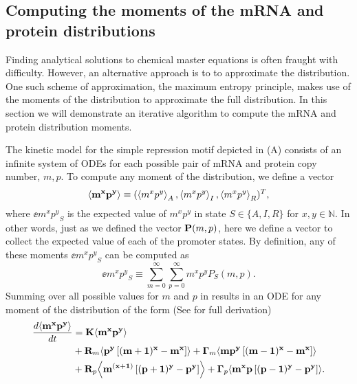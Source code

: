 \subsection{Computing the moments of the mRNA and protein distributions}
\label{sec_moments}

Finding analytical solutions to chemical master equations is often fraught with
difficulty. However, an alternative approach is to to approximate the
distribution. One such scheme of approximation, the maximum entropy principle,
makes use of the moments of the distribution to approximate the full
distribution. In this section we will demonstrate an iterative algorithm to
compute the mRNA and protein distribution moments.

The kinetic model for the simple repression motif depicted in
(A) consists of an infinite system of ODEs for each
possible pair of mRNA and protein copy number, $m, p$. To compute any moment of
the distribution, we define a vector
\begin{equation}
	\left\langle \mathbf{m^x p^y} \right\rangle \equiv (\left\langle m^x p^y \right\rangle_A, \left\langle m^x p^y \right\rangle_I, \left\langle m^x p^y \right\rangle_R)^T,
\end{equation}
where $\ee{m^x p^y}_S$ is the expected value of $m^x p^y$ in state $S \in \{A,
I, R\}$ for $x, y \in \mathbb{N}$. In other words, just as we defined the
vector $\mathbf{P}(m, p)$, here we define a vector to collect the expected value of
each of the promoter states. By definition, any of these moments $\ee{m^x
p^y}_S$ can be computed as
\begin{equation}
  \ee{m^x p^y}_S \equiv \sum_{m=0}^\infty \sum_{p=0}^\infty m^x p^y P_S(m, p).
  \label{eq_mom_def}
\end{equation}
Summing over all possible values for $m$ and $p$ in 
results in an ODE for any moment of the distribution of the form (See
 for full derivation)
\begin{equation}
  \begin{aligned}
    {d{\mathbf{\left\langle m^x p^y \right\rangle}} \over dt} &=
    \mathbf{K} \mathbf{\left\langle m^x p^y \right\rangle}\\
    &+ \mathbf{R}_m \mathbf{\left\langle p^y \left[ (m + 1)^x -m^x \right] \right\rangle}
     + \mathbf{\Gamma}_m \mathbf{\left\langle m p^y \left[ (m - 1)^x - m^x \right] \right\rangle}\\
    &+ \mathbf{R}_p \mathbf{\left\langle m^{(x + 1)} \left[ (p + 1)^y - p^y \right] \right\rangle}
     + \mathbf{\Gamma}_p \mathbf{\left\langle m^x p \left[ (p - 1)^y - p^y \right] \right\rangle}.
    \label{eq_gral_mom}
  \end{aligned}
\end{equation}

